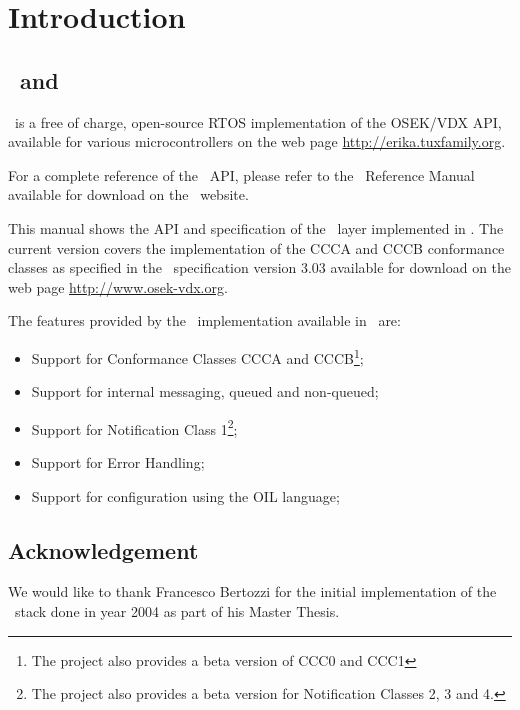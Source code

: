 \chapter{Introduction}

\section{\ee\ and \oc}

\ee\ is a free of charge, open-source RTOS implementation of the
OSEK/VDX API, available for various microcontrollers on the web page
\url{http://erika.tuxfamily.org}.

For a complete reference of the \ee\ API, please refer to the
\ee\ Reference Manual available for download on the \ee\ website.

This manual shows the API and specification of the \oc\ layer
implemented in \ee. The current version covers the
implementation of the CCCA and CCCB conformance classes as specified
in the \oc\ specification version 3.03 available for download on
the web page \url{http://www.osek-vdx.org}.

The features provided by the \oc\ implementation available in \ee\ are:

\begin{itemize}
\item Support for Conformance Classes CCCA and CCCB\footnote{The project also provides a beta version of CCC0 and CCC1};
\item Support for internal messaging, queued and non-queued;
\item Support for Notification Class 1\footnote{The project also provides a beta version for Notification Classes 2, 3 and 4.};
\item Support for Error Handling;
\item Support for configuration using the OIL language;
\end{itemize}


\section{Acknowledgement}
We would like to thank Francesco Bertozzi for the initial
implementation of the \oc\ stack done in year 2004 as part of his
Master Thesis.

